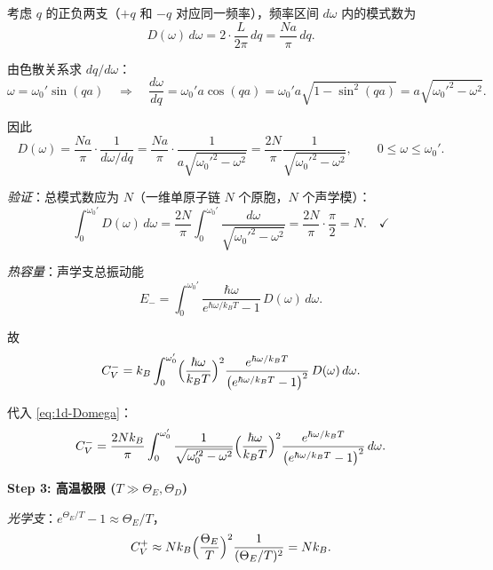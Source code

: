 \begin{derivationbox}[标准解题过程]
考虑 $q$ 的正负两支（$+q$ 和 $-q$ 对应同一频率），频率区间 $d\omega$ 内的模式数为
\begin{equation}
D(\omega)\,d\omega=2\cdot\frac{L}{2\pi}\,dq=\frac{Na}{\pi}\,dq.
\end{equation}

由色散关系求 $dq/d\omega$：
\begin{equation}
\omega=\omega_0'\sin(qa)\quad\Longrightarrow\quad
\frac{d\omega}{dq}=\omega_0'a\cos(qa)=\omega_0'a\sqrt{1-\sin^2(qa)}=a\sqrt{\omega_0'^2-\omega^2}.
\end{equation}

因此
\begin{equation}
D(\omega)=\frac{Na}{\pi}\cdot\frac{1}{d\omega/dq}
=\frac{Na}{\pi}\cdot\frac{1}{a\sqrt{\omega_0'^2-\omega^2}}
=\frac{2N}{\pi}\frac{1}{\sqrt{\omega_0'^2-\omega^2}},\qquad 0\le\omega\le\omega_0'.
\label{eq:1d-Domega}
\end{equation}

\textit{验证}：总模式数应为 $N$（一维单原子链 $N$ 个原胞，$N$ 个声学模）：
\begin{equation}
\int_0^{\omega_0'}D(\omega)\,d\omega
=\frac{2N}{\pi}\int_0^{\omega_0'}\frac{d\omega}{\sqrt{\omega_0'^2-\omega^2}}
=\frac{2N}{\pi}\cdot\frac{\pi}{2}=N.\quad\checkmark
\end{equation}

\textit{热容量}：声学支总振动能
\begin{equation}
E_-=\int_0^{\omega_0'}\frac{\hbar\omega}{e^{\hbar\omega/k_BT}-1}\,D(\omega)\,d\omega.
\end{equation}

故
\begin{equation}
C_V^-=k_B\int_0^{\omega_0'}\Bigl(\frac{\hbar\omega}{k_BT}\Bigr)^2\frac{e^{\hbar\omega/k_BT}}{\bigl(e^{\hbar\omega/k_BT}-1\bigr)^2}\,D(\omega)\,d\omega.
\end{equation}

代入 \eqref{eq:1d-Domega}：
\begin{equation}
C_V^-=\frac{2Nk_B}{\pi}\int_0^{\omega_0'}\frac{1}{\sqrt{\omega_0'^2-\omega^2}}\Bigl(\frac{\hbar\omega}{k_BT}\Bigr)^2\frac{e^{\hbar\omega/k_BT}}{\bigl(e^{\hbar\omega/k_BT}-1\bigr)^2}\,d\omega.
\end{equation}

\textbf{Step 3: 高温极限 ($T\gg\Theta_E,\Theta_D$)}

\textit{光学支}：$e^{\Theta_E/T}-1\approx\Theta_E/T$，
\begin{equation}
C_V^+\approx Nk_B\Bigl(\frac{\Theta_E}{T}\Bigr)^2\frac{1}{(\Theta_E/T)^2}=Nk_B.
\end{equation}


\end{derivationbox}
